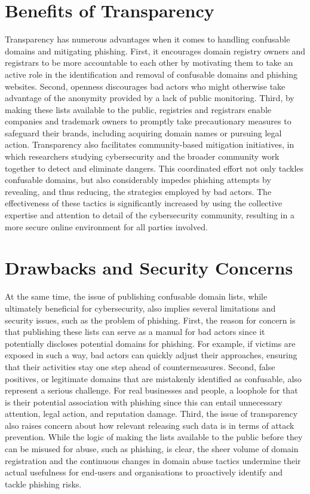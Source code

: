 \section{Benefits of Transparency }


Transparency has numerous advantages when it comes to handling confusable domains and mitigating phishing. First, it encourages domain registry owners and registrars to be more accountable to each other by motivating them to take an active role in the identification and removal of confusable domains and phishing websites. Second, openness discourages bad actors who might otherwise take advantage of the anonymity provided by a lack of public monitoring. Third, by making these lists available to the public, registries and registrars enable companies and trademark owners to promptly take precautionary measures to safeguard their brands, including acquiring domain names or pursuing legal action. Transparency also facilitates community-based mitigation initiatives, in which researchers studying cybersecurity and the broader community work together to detect and eliminate dangers. This coordinated effort not only tackles confusable domains, but also considerably impedes phishing attempts by revealing, and thus reducing, the strategies employed by bad actors. The effectiveness of these tactics is significantly increased by using the collective expertise and attention to detail of the cybersecurity community, resulting in a more secure online environment for all parties involved.


\section{Drawbacks and Security Concerns} 

At the same time, the issue of publishing confusable domain lists, while ultimately beneficial for cybersecurity, also implies several limitations and security issues, such as the problem of phishing. First, the reason for concern is that publishing these lists can serve as a manual for bad actors since it potentially discloses potential domains for phishing. For example, if victims are exposed in such a way, bad actors can quickly adjust their approaches, ensuring that their activities stay one step ahead of countermeasures. Second, false positives, or legitimate domains that are mistakenly identified as confusable, also represent a serious challenge. For real businesses and people, a loophole for that is their potential association with phishing since this can entail unnecessary attention, legal action, and reputation damage. Third, the issue of transparency also raises concern about how relevant releasing such data is in terms of attack prevention. While the logic of making the lists available to the public before they can be misused for abuse, such as phishing, is clear, the sheer volume of domain registration and the continuous changes in domain abuse tactics undermine their actual usefulness for end-users and organisations to proactively identify and tackle phishing risks.



